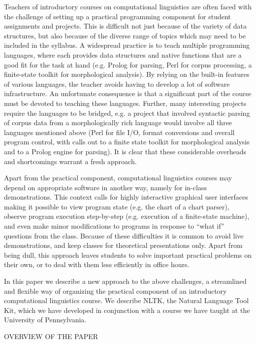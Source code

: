 \documentclass[11pt]{article}
\begin{document}
Teachers of introductory courses on computational linguistics are
often faced with the challenge of setting up a practical programming
component for student assignments and projects.  This is difficult not
just because of the variety of data structures, but also because of
the diverse range of topics which may need to be included in the
syllabus.  A widespread practice is to teach multiple programming
languages, where each provides data structures and native functions
that are a good fit for the task at hand (e.g. Prolog for parsing,
Perl for corpus processing, a finite-state toolkit for morphological
analysis).  By relying on the built-in features of various languages,
the teacher avoids having to develop a lot of software infrastructure.
An unfortunate consequence is that a significant part of the course
must be devoted to teaching these languages.  Further, many
interesting projects require the languages to be bridged, e.g. a
project that involved syntactic parsing of corpus data from a
morphologically rich language would involve all three languages
mentioned above (Perl for file I/O, format conversions and overall
program control, with calls out to a finite state toolkit for
morphological analysis and to a Prolog engine for parsing).  It is
clear that these considerable overheads and shortcomings warrant a
fresh approach.

Apart from the practical component, computational linguistics courses
may depend on appropriate software in another way, namely for in-class
demonstrations.  This context calls for highly interactive graphical
user interfaces making it possible to view program state (e.g. the
chart of a chart parser), observe program execution step-by-step
(e.g. execution of a finite-state machine), and even make minor
modifications to programs in response to ``what if'' questions from
the class.  Because of these difficulties it is common to avoid live
demonstrations, and keep classes for theoretical presentations only.
Apart from being dull, this approach leaves students to solve
important practical problems on their own, or to deal with them less
efficiently in office hours.

In this paper we describe a new approach to the above challenges,
a streamlined and flexible way of organizing the practical component
of an introductory computational linguistics course.  We describe
NLTK, the Natural Language Tool Kit, which we have developed in
conjunction with a course we have taught at the University of Pennsylvania.

OVERVIEW OF THE PAPER
\end{document}
